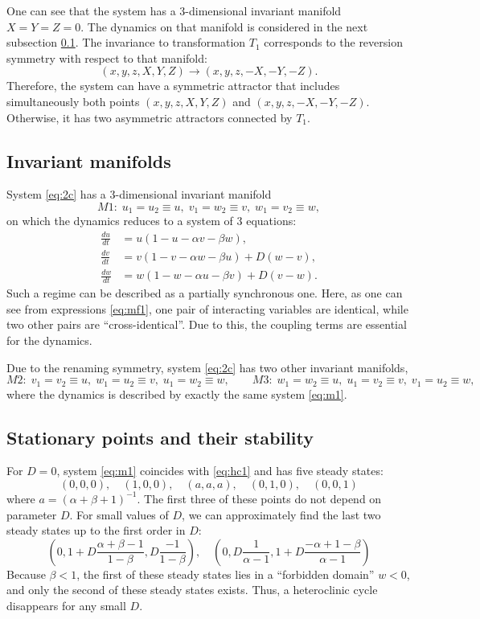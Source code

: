 \documentclass[3p,number,review,sort&compress]{elsarticle}
\begin{document}
One can see that the system has a 3-dimensional invariant manifold $X=Y=Z=0$.
The dynamics on that manifold is considered in the next subsection \ref{sec:im}. 
The invariance to transformation $T_1$ corresponds to the reversion symmetry with respect to that manifold:
$$(x,y,z,X,Y,Z)\to(x,y,z,-X,-Y,-Z).$$ 
Therefore, the system can have a symmetric attractor that includes simultaneously both points $(x,y,z,X,Y,Z)$ and $(x,y,z,-X,-Y,-Z)$. Otherwise, it has two asymmetric attractors connected by $T_1$.
\subsection{Invariant manifolds}
\label{sec:im}
System \eqref{eq:2c} has a 3-dimensional invariant manifold
\begin{equation}
M1:\;u_1=u_2\equiv u,\;v_1=w_2\equiv v,\;w_1=v_2\equiv w,
\label{eq:mf1}
\end{equation}
on which the dynamics reduces to a system of 3 equations:
\begin{equation}
\begin{aligned}
\frac{du}{dt}&=u(1-u-\alpha v-\beta w),\\
\frac{dv}{dt}&=v(1-v-\alpha w-\beta u)+D(w-v),\\
\frac{dw}{dt}&=w(1-w-\alpha u-\beta v)+D(v-w).
\end{aligned}
\label{eq:m1}  
\end{equation}
Such a regime can be described as a partially synchronous one. Here,
as one can see from expressions \eqref{eq:mf1}, one pair of interacting variables are identical, while two other
pairs are ``cross-identical''. Due to this, the coupling terms are essential for the dynamics.

Due to the renaming symmetry, system \eqref{eq:2c} has 
 two other invariant manifolds, 
\begin{equation}
M2:\;v_1=v_2\equiv u,\;w_1=u_2\equiv v,\;u_1=w_2\equiv w,\qquad
M3:\;w_1=w_2\equiv u,\;u_1=v_2\equiv v,\;v_1=u_2\equiv w,
\label{eq:mf23}
\end{equation}
where the dynamics is described by exactly the same system 
\eqref{eq:m1}.
\subsection{Stationary points and their stability}
For $D=0$, system \eqref{eq:m1} coincides with \eqref{eq:hc1} and has
five steady states:
\[
(0,0,0),\quad (1,0,0),\quad (a,a,a),\quad(0,1,0),\quad (0,0,1)
\]
where $a=(\alpha+\beta+1)^{-1}$. The first three of these points do
not depend on parameter $D$. For small values of $D$, we 
can approximately find the last two steady states up to the first order in $D$:
\[
(0,1+D\frac{\alpha+\beta-1}{1-\beta},D\frac{-1}{1-\beta}),\quad
(0,D\frac{1}{\alpha-1},1+D\frac{-\alpha+1-\beta}{\alpha-1})
\]
Because $\beta<1$, the first of these steady states lies in a ``forbidden domain''
$w<0$, and only the second of these steady states exists. Thus, a heteroclinic cycle disappears for any small $D$.
\end{document}
